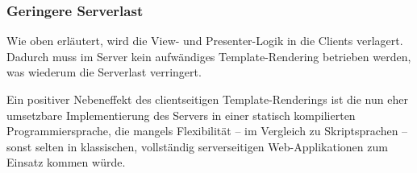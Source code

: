\subsubsection{Geringere Serverlast}
\label{sssec:eaa_geringere_serverlast}

Wie oben erläutert, wird die View- und Presenter-Logik in die Clients
verlagert.  Dadurch muss im Server kein aufwändiges Template-Rendering
betrieben werden, was wiederum die Serverlast verringert.

Ein positiver Nebeneffekt des clientseitigen Template-Renderings ist die nun
eher umsetzbare Implementierung des Servers in einer statisch kompilierten
Programmiersprache, die mangels Flexibilität -- im Vergleich zu Skriptsprachen
-- sonst selten in klassischen, vollständig serverseitigen Web-Applikationen
zum Einsatz kommen würde.
